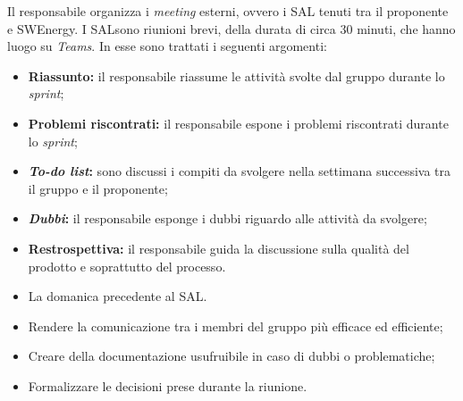 \label{organizzare-meeting-esterno}

Il responsabile organizza i \textit{meeting} esterni, ovvero i SAL\g
tenuti tra il proponente e SWEnergy.
I SAL\g sono riunioni brevi, della durata di circa 30 minuti, che hanno
luogo su \textit{Teams}. In esse
sono trattati i seguenti argomenti:
\begin{itemize}
	\item \textbf{Riassunto:} il responsabile riassume le attività svolte dal
	      gruppo durante lo \textit{sprint};

	\item \textbf{Problemi riscontrati:} il responsabile espone i problemi
	      riscontrati durante lo \textit{sprint};

	\item \textbf{\textit{To-do list}:} sono discussi i compiti da svolgere nella
	      settimana successiva tra il gruppo e il proponente;

	\item \textbf{\textit{Dubbi}:} il responsabile esponge i dubbi riguardo alle
	      attività da svolgere;

	\item \textbf{Restrospettiva:} il responsabile guida la discussione sulla
	      qualità del prodotto e soprattutto del processo.
\end{itemize}

\begin{itemize}
	\item La domanica precedente al SAL\g.
\end{itemize}

\begin{itemize}
	\item Rendere la comunicazione tra i membri del gruppo più efficace ed
	      efficiente;

	\item Creare della documentazione usufruibile in caso di dubbi o
	      problematiche;

	\item Formalizzare le decisioni prese durante la riunione.
\end{itemize}

